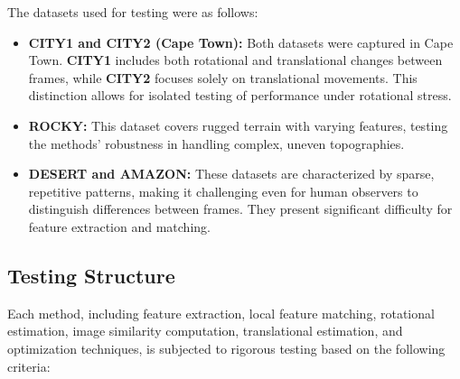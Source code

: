 The datasets used for testing were as follows:

\begin{itemize}
    \item \textbf{CITY1 and CITY2 (Cape Town):}  
    Both datasets were captured in Cape Town. \textbf{CITY1} includes both rotational and translational changes between frames, while \textbf{CITY2} focuses solely on translational movements. This distinction allows for isolated testing of performance under rotational stress.
    
    \item \textbf{ROCKY:}  
    This dataset covers rugged terrain with varying features, testing the methods' robustness in handling complex, uneven topographies.
    
    \item \textbf{DESERT and AMAZON:}  
    These datasets are characterized by sparse, repetitive patterns, making it challenging even for human observers to distinguish differences between frames. They present significant difficulty for feature extraction and matching.
\end{itemize}



\subsection{Testing Structure}

Each method, including feature extraction, local feature matching, rotational estimation, image similarity computation, translational estimation, and optimization techniques, is subjected to rigorous testing based on the following criteria:

